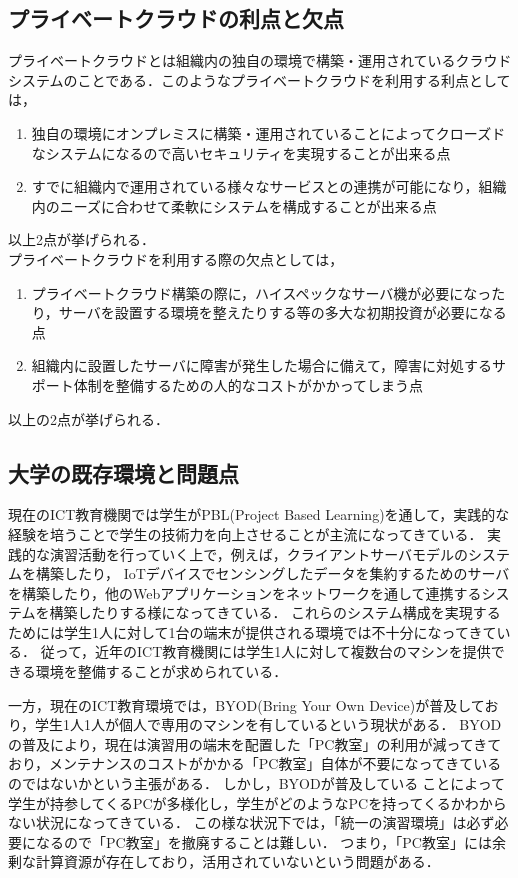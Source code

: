 \subsection{プライベートクラウドの利点と欠点}
プライベートクラウドとは組織内の独自の環境で構築・運用されているクラウドシステムのことである．このようなプライベートクラウドを利用する利点としては，
\begin{enumerate}
	\item 独自の環境にオンプレミスに構築・運用されていることによってクローズドなシステムになるので高いセキュリティを実現することが出来る点
	\item すでに組織内で運用されている様々なサービスとの連携が可能になり，組織内のニーズに合わせて柔軟にシステムを構成することが出来る点
\end{enumerate}
以上2点が挙げられる．\\
プライベートクラウドを利用する際の欠点としては，
\begin{enumerate}
	\item プライベートクラウド構築の際に，ハイスペックなサーバ機が必要になったり，サーバを設置する環境を整えたりする等の多大な初期投資が必要になる点
	\item 組織内に設置したサーバに障害が発生した場合に備えて，障害に対処するサポート体制を整備するための人的なコストがかかってしまう点
\end{enumerate}
以上の2点が挙げられる．

\subsection{大学の既存環境と問題点}
現在のICT教育機関では学生がPBL(Project Based Learning)を通して，実践的な経験を培うことで学生の技術力を向上させることが主流になってきている．
実践的な演習活動を行っていく上で，例えば，クライアントサーバモデルのシステムを構築したり，
IoTデバイスでセンシングしたデータを集約するためのサーバを構築したり，他のWebアプリケーションをネットワークを通して連携するシステムを構築したりする様になってきている．
これらのシステム構成を実現するためには学生1人に対して1台の端末が提供される環境では不十分になってきている．
従って，近年のICT教育機関には学生1人に対して複数台のマシンを提供できる環境を整備することが求められている．
\par 一方，現在のICT教育環境では，BYOD(Bring Your Own Device)が普及しており，学生1人1人が個人で専用のマシンを有しているという現状がある．
BYODの普及により，現在は演習用の端末を配置した「PC教室」の利用が減ってきており，メンテナンスのコストがかかる「PC教室」自体が不要になってきているのではないかという主張がある．
しかし，BYODが普及していることによって学生が持参してくるPCが多様化し，学生がどのようなPCを持ってくるかわからない状況になってきている．
この様な状況下では，「統一の演習環境」は必ず必要になるので「PC教室」を撤廃することは難しい．
つまり，「PC教室」には余剰な計算資源が存在しており，活用されていないという問題がある．

